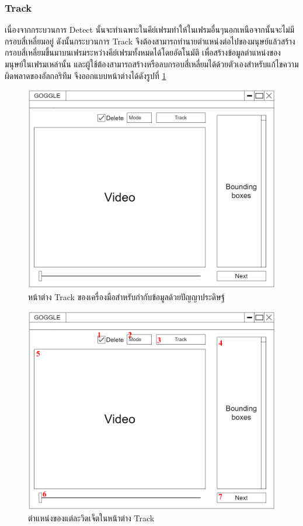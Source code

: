 \subsubsection{Track}
เนื่องจากกระบวนการ Detect นั้นจะทำเฉพาะในคีย์เฟรมทำให้ในเฟรมอื่นๆนอกเหนือจากนั้นจะไม่มีกรอบสี่เหลี่ยมอยู่
ดังนั้นกระบวนการ Track จึงต้องสามารถทำนายตำแหน่งต่อไปของมนุษย์แล้วสร้างกรอบสี่เหลี่ยมขึ้นมาบนเฟรมระหว่างคีย์เฟรมทั้งหมดได้โดยอัตโนมัติ
เพื่อสร้างข้อมูลตำแหน่งของมนุษย์ในเฟรมเหล่านั้น และผู้ใช้ต้องสามารถสร้างหรือลบกรอบสี่เหลี่ยมได้ด้วยตัวเองสำหรับแก้ไขความผิดพลาดของอัลกอริทึม
จึงออกแบบหน้าต่างได้ดังรูปที่ \ref{fig:TrackDraft}
\begin{figure}[!ht]
    \centering
    \includegraphics[width=1\textwidth]{chapter3/images/3_6/TrackDraft.png}
    \caption{หน้าต่าง Track ของเครื่องมือสำหรับกำกับข้อมูลด้วยปัญญาประดิษฐ์}
    \label{fig:TrackDraft}
\end{figure}
\clearpage
\begin{figure}[!ht]
    \centering
    \includegraphics[width=1\textwidth]{chapter3/images/3_6/TrackDraft_point.png}
    \caption{ตำแหน่งของแต่ละวิดเจ็ตในหน้าต่าง Track}
    \label{fig:TrackDraft_point}
\end{figure}
